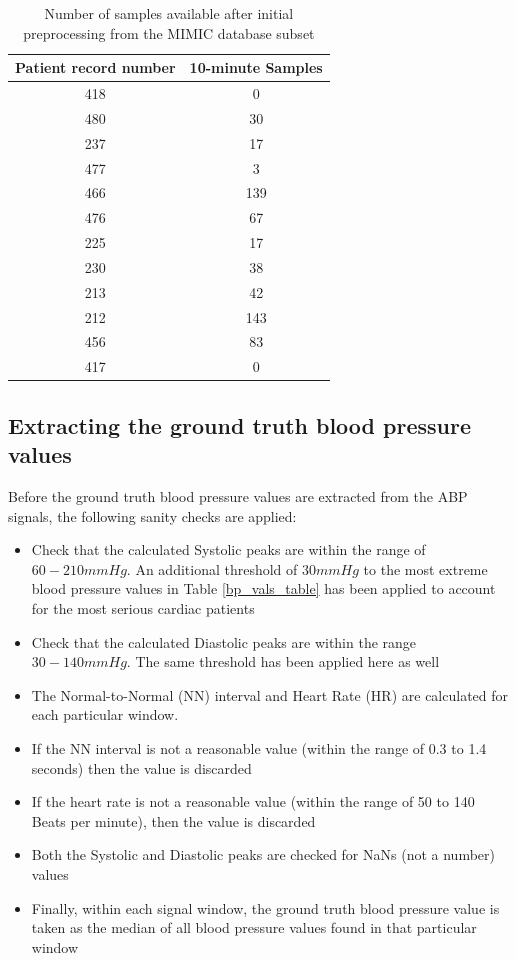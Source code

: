 \begin{table}[H]
        \centering
        \caption{Number of samples available after initial preprocessing from the MIMIC database subset}
        \label{tabSamplesAvailable}
        \begin{tabular}{cc}
        \hline
        \textbf{Patient record number} & \textbf{10-minute Samples} \\ \hline
        418 &  0\\
        480 &  30\\
        237 &  17\\
        477 &  3\\
        466 &  139\\
        476 &  67\\
        225 &  17\\
        230 &  38\\
        213 &  42\\
        212 &  143\\
        456 &  83\\
        417 &  0\\ \hline
        \end{tabular}
\end{table}   

\subsection{Extracting the ground truth blood pressure values}
Before the ground truth blood pressure values are extracted from the ABP signals, the following sanity checks are applied:
\begin{itemize}
    \item Check that the calculated Systolic peaks are within the range of $60-210 mmHg$. An additional threshold of $30 mmHg$ to the most extreme blood pressure values in Table \ref{bp_vals_table} has been applied to account for the most serious cardiac patients
    \item Check that the calculated Diastolic peaks are within the range $30-140 mmHg$. The same threshold has been applied here as well
    \item The Normal-to-Normal (NN) interval and Heart Rate (HR) are calculated for each particular window.
    \item If the NN interval is not a reasonable value (within the range of 0.3 to 1.4 seconds) then the value is discarded
    \item If the heart rate is not a reasonable value (within the range of 50 to 140 Beats per minute), then the value is discarded
    \item Both the Systolic and Diastolic peaks are checked for NaNs (not a number) values
    \item Finally, within each signal window, the ground truth blood pressure value is taken as the median of all blood pressure values found in that particular window
\end{itemize}


